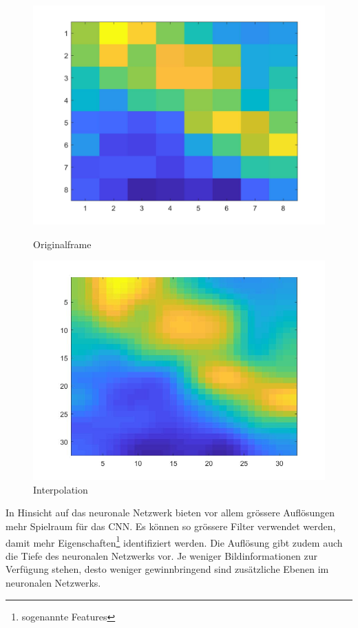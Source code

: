 \begin{figure}[!ht]
	\centering
	\begin{minipage}[c]{0.49\linewidth}
	\centering
	\includegraphics[width=1.0\linewidth]{fig/interpol_1}
	\caption[Originalframe]{Originalframe}
	\label{fig:interpol1}
	\end{minipage}
	\begin{minipage}[c]{0.49\linewidth}
		\centering
	\includegraphics[width=1.0\linewidth]{fig/interpol_2}
	\caption[bikubische interpoliert]{Interpolation}
	\label{fig:interpol2}
	\end{minipage}
\end{figure}

In Hinsicht auf das neuronale Netzwerk bieten vor allem grössere Auflösungen mehr Spielraum für das \ac{CNN}. Es können so grössere Filter verwendet werden, damit mehr Eigenschaften\footnote{sogenannte Features} identifiziert werden. Die Auflösung gibt zudem auch die Tiefe des neuronalen Netzwerks vor. Je weniger Bildinformationen zur Verfügung stehen, desto weniger gewinnbringend sind zusätzliche Ebenen im neuronalen Netzwerks. 

